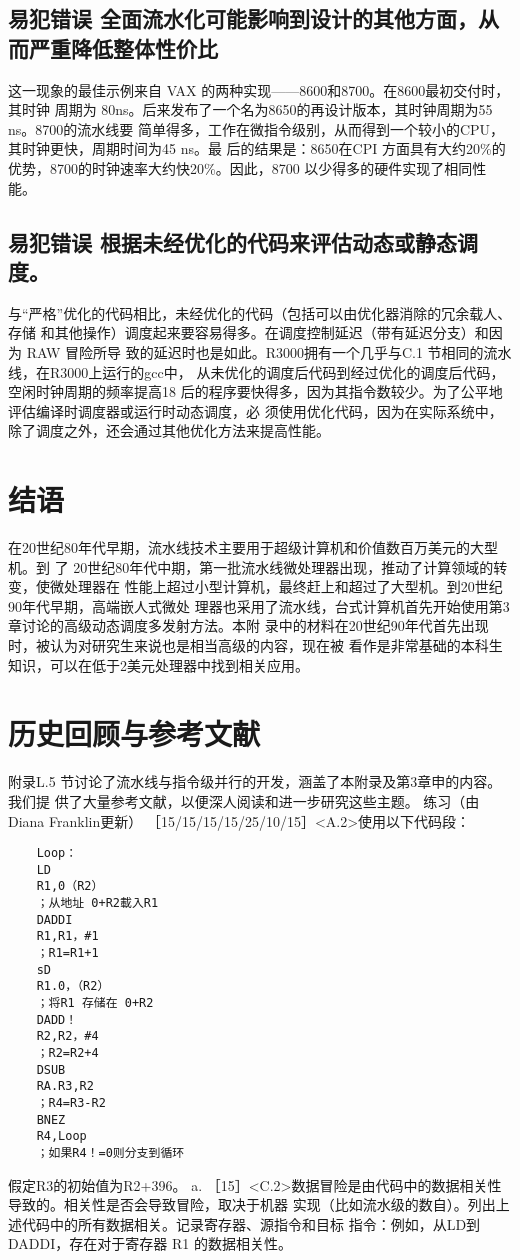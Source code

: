 \subsection{易犯错误 全⾯流⽔化可能影响到设计的其他⽅⾯，从⽽严重降低整体性价⽐}
这一现象的最佳示例来自 VAX 的两种实现——8600和8700。在8600最初交付时，其时钟
周期为 80ns。后来发布了一个名为8650的再设计版本，其时钟周期为55 ns。8700的流水线要
简单得多，工作在微指令级别，从而得到一个较小的CPU，其时钟更快，周期时间为45 ns。最
后的结果是：8650在CPI 方面具有大约20\%的优势，8700的时钟速率大约快20\%。因此，8700
以少得多的硬件实现了相同性能。

\subsection{易犯错误 根据未经优化的代码来评估动态或静态调度。}
与“严格”优化的代码相比，未经优化的代码（包括可以由优化器消除的冗余载人、存储
和其他操作）调度起来要容易得多。在调度控制延迟（带有延迟分支）和因为 RAW 冒险所导
致的延迟时也是如此。R3000拥有一个几乎与C.1 节相同的流水线，在R3000上运行的gcc中，
从未优化的调度后代码到经过优化的调度后代码，空闲时钟周期的频率提高18%
后的程序要快得多，因为其指令数较少。为了公平地评估编译时调度器或运行时动态调度，必
须使用优化代码，因为在实际系统中，除了调度之外，还会通过其他优化方法来提高性能。

\section{结语}
在20世纪80年代早期，流水线技术主要用于超级计算机和价值数百万美元的大型机。到
了 20世纪80年代中期，第一批流水线微处理器出现，推动了计算领域的转变，使微处理器在
性能上超过小型计算机，最终赶上和超过了大型机。到20世纪90年代早期，高端嵌人式微处
理器也采用了流水线，台式计算机首先开始使用第3章讨论的高级动态调度多发射方法。本附
录中的材料在20世纪90年代首先出现时，被认为对研究生来说也是相当高级的内容，现在被
看作是非常基础的本科生知识，可以在低于2美元处理器中找到相关应用。

\section{历史回顾与参考文献}
附录L.5 节讨论了流水线与指令级并行的开发，涵盖了本附录及第3章申的内容。我们提
供了大量参考文献，以便深人阅读和进一步研究这些主题。
练习（由Diana Franklin更新）
［15/15/15/15/25/10/15］<A.2>使用以下代码段：
\begin{verbatim}
    Loop：
    LD
    R1,0（R2）
    ；从地址 0+R2載入R1
    DADDI
    R1,R1，#1
    ；R1=R1+1
    sD
    R1.0，（R2）
    ；将R1 存储在 0+R2
    DADD！
    R2,R2，#4
    ；R2=R2+4
    DSUB
    RA.R3,R2
    ；R4=R3-R2
    BNEZ
    R4,Loop
    ；如果R4！=0则分支到循环
\end{verbatim}
假定R3的初始值为R2+396。
a. ［15］<C.2>数据冒险是由代码中的数据相关性导致的。相关性是否会导致冒险，取决于机器
实现（比如流水级的数自）。列出上述代码中的所有数据相关。记录寄存器、源指令和目标
指令：例如，从LD到 DADDI，存在对于寄存器 R1 的数据相关性。

